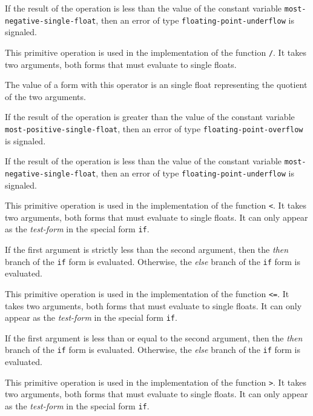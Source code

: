 If the result of the operation is less than the value of the constant
variable \texttt{most-negative-single-float}, then an error of type
\texttt{floating-point-underflow} is signaled.


This primitive operation is used in the implementation of the
\commonlisp{} function \texttt{/}.  It takes two arguments, both forms
that must evaluate to single floats.

The value of a form with this operator is an single float
representing the quotient of the two arguments.

If the result of the operation is greater than the value of the
constant variable \texttt{most-positive-single-float}, then an error of
type \texttt{floating-point-overflow} is signaled.

If the result of the operation is less than the value of the constant
variable \texttt{most-negative-single-float}, then an error of type
\texttt{floating-point-underflow} is signaled.


This primitive operation is used in the implementation of the
\commonlisp{} function \texttt{<}.  It takes two arguments, both forms
that must evaluate to single floats.  It can only appear as the
\emph{test-form} in the special form \texttt{if}.

If the first argument is strictly less than the second argument, then
the \emph{then} branch of the \texttt{if} form is evaluated.
Otherwise, the \emph{else} branch of the \texttt{if} form is
evaluated.


This primitive operation is used in the implementation of the
\commonlisp{} function \texttt{<=}.  It takes two arguments, both forms
that must evaluate to single floats.  It can only appear as the
\emph{test-form} in the special form \texttt{if}.

If the first argument is less than or equal to the second argument,
then the \emph{then} branch of the \texttt{if} form is evaluated.
Otherwise, the \emph{else} branch of the \texttt{if} form is
evaluated.


This primitive operation is used in the implementation of the
\commonlisp{} function \texttt{>}.  It takes two arguments, both forms
that must evaluate to single floats.  It can only appear as the
\emph{test-form} in the special form \texttt{if}.

